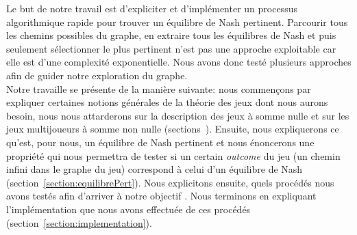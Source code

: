 Le but de notre travail est d'expliciter et d'implémenter un processus algorithmique rapide pour trouver un équilibre de Nash pertinent. Parcourir tous les chemins possibles du graphe, en extraire tous les équilibres de Nash et puis seulement sélectionner le plus pertinent n'est pas une approche exploitable car elle est d'une complexité exponentielle. Nous avons donc testé plusieurs approches afin de guider notre exploration du graphe.\\


Notre travaille se présente de la manière suivante: nous commençons par expliquer certaines notions générales de la théorie des jeux dont nous aurons besoin, nous nous attarderons sur la description des jeux à somme nulle et sur les jeux multijoueurs à somme non nulle (sections~). Ensuite, nous expliquerons ce qu'est, pour nous, un équilibre de Nash pertinent et nous énoncerons une propriété qui nous permettra de tester si un certain \emph{outcome} du jeu (un chemin infini dans le graphe du jeu) correspond à celui d'un équilibre de Nash (section~\ref{section:equilibrePert}). Nous explicitons ensuite, quels procédés nous avons testés afin d'arriver à notre objectif . Nous terminons en expliquant l'implémentation que nous avons effectuée de ces procédés  (section~\ref{section:implementation}).
